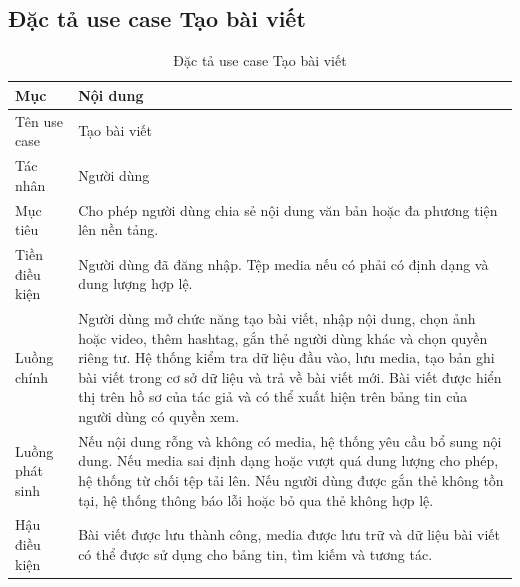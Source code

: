 \documentclass[../DoAn.tex]{subfiles}
\begin{document}
\subsection{Đặc tả use case Tạo bài viết}
\label{subsection:2.3.2}
\begin{table}[H]
\centering
\caption{Đặc tả use case Tạo bài viết}
\label{table:uc-create-post}
\begin{tabular}{|p{3.5cm}|p{9.5cm}|}
\hline
\textbf{Mục} & \textbf{Nội dung} \\
\hline
Tên use case & Tạo bài viết \\
\hline
Tác nhân & Người dùng \\
\hline
Mục tiêu & Cho phép người dùng chia sẻ nội dung văn bản hoặc đa phương tiện lên nền tảng. \\
\hline
Tiền điều kiện & Người dùng đã đăng nhập. Tệp media nếu có phải có định dạng và dung lượng hợp lệ. \\
\hline
Luồng chính & Người dùng mở chức năng tạo bài viết, nhập nội dung, chọn ảnh hoặc video, thêm hashtag, gắn thẻ người dùng khác và chọn quyền riêng tư. Hệ thống kiểm tra dữ liệu đầu vào, lưu media, tạo bản ghi bài viết trong cơ sở dữ liệu và trả về bài viết mới. Bài viết được hiển thị trên hồ sơ của tác giả và có thể xuất hiện trên bảng tin của người dùng có quyền xem. \\
\hline
Luồng phát sinh & Nếu nội dung rỗng và không có media, hệ thống yêu cầu bổ sung nội dung. Nếu media sai định dạng hoặc vượt quá dung lượng cho phép, hệ thống từ chối tệp tải lên. Nếu người dùng được gắn thẻ không tồn tại, hệ thống thông báo lỗi hoặc bỏ qua thẻ không hợp lệ. \\
\hline
Hậu điều kiện & Bài viết được lưu thành công, media được lưu trữ và dữ liệu bài viết có thể được sử dụng cho bảng tin, tìm kiếm và tương tác. \\
\hline
\end{tabular}
\end{table}
\end{document}
